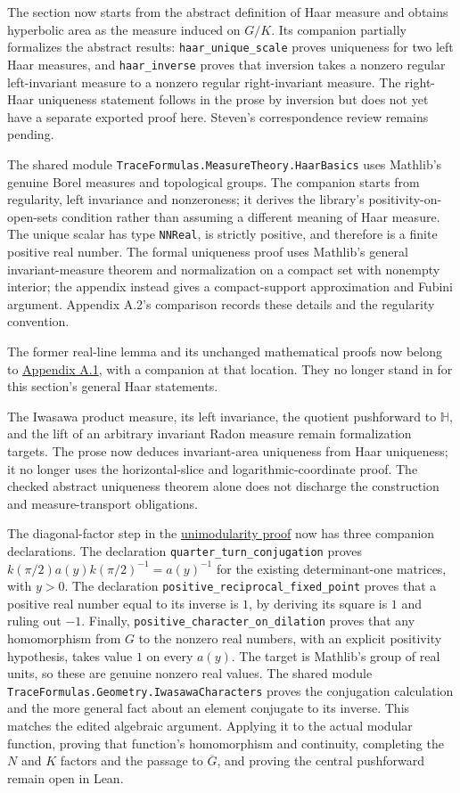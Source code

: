The section now starts from the abstract definition of Haar measure and obtains hyperbolic area as the measure induced on $G/K$. Its companion partially formalizes the abstract results: \texttt{haar\_unique\_scale} proves uniqueness for two left Haar measures, and \texttt{haar\_inverse} proves that inversion takes a nonzero regular left-invariant measure to a nonzero regular right-invariant measure. The right-Haar uniqueness statement follows in the prose by inversion but does not yet have a separate exported proof here. Steven's correspondence review remains pending.

The shared module \texttt{TraceFormulas.MeasureTheory.HaarBasics} uses Mathlib's genuine Borel measures and topological groups. The companion starts from regularity, left invariance and nonzeroness; it derives the library's positivity-on-open-sets condition rather than assuming a different meaning of Haar measure. The unique scalar has type \texttt{NNReal}, is strictly positive, and therefore is a finite positive real number. The formal uniqueness proof uses Mathlib's general invariant-measure theorem and normalization on a compact set with nonempty interior; the appendix instead gives a compact-support approximation and Fubini argument. Appendix A.2's comparison records these details and the regularity convention.

The former real-line lemma and its unchanged mathematical proofs now belong to \hyperref[measure.translation-invariant-line]{Appendix A.1}, with a companion at that location. They no longer stand in for this section's general Haar statements.

The Iwasawa product measure, its left invariance, the quotient pushforward to $\mathbb H$, and the lift of an arbitrary invariant Radon measure remain formalization targets. The prose now deduces invariant-area uniqueness from Haar uniqueness; it no longer uses the horizontal-slice and logarithmic-coordinate proof. The checked abstract uniqueness theorem alone does not discharge the construction and measure-transport obligations.

The diagonal-factor step in the \hyperref[modular.unimodular]{unimodularity proof} now has three companion declarations. The declaration \texttt{quarter\_turn\_conjugation} proves $k(\pi/2)a(y)k(\pi/2)^{-1}=a(y)^{-1}$ for the existing determinant-one matrices, with $y>0$. The declaration \texttt{positive\_reciprocal\_fixed\_point} proves that a positive real number equal to its inverse is $1$, by deriving its square is $1$ and ruling out $-1$. Finally, \texttt{positive\_character\_on\_dilation} proves that any homomorphism from $G$ to the nonzero real numbers, with an explicit positivity hypothesis, takes value $1$ on every $a(y)$. The target is Mathlib's group of real units, so these are genuine nonzero real values. The shared module \texttt{TraceFormulas.Geometry.IwasawaCharacters} proves the conjugation calculation and the more general fact about an element conjugate to its inverse. This matches the edited algebraic argument. Applying it to the actual modular function, proving that function's homomorphism and continuity, completing the $N$ and $K$ factors and the passage to $\overline G$, and proving the central pushforward remain open in Lean.

